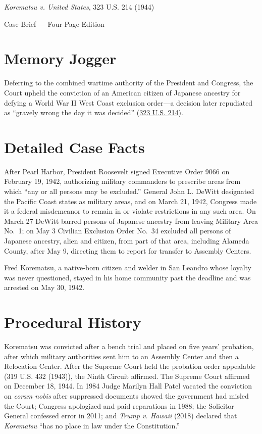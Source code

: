 \documentclass[12pt]{article}
\begin{document}
\begin{center}
{\LARGE \textit{Korematsu v. United States}, 323 U.S. 214 (1944)\par}
\vspace{0.8em}
{\large Case Brief --- Four-Page Edition\par}
\end{center}
\vspace{1em}

\section{Memory Jogger}

Deferring to the combined wartime authority of the President and Congress, the Court upheld the conviction of an American citizen of Japanese ancestry for defying a World War II West Coast exclusion order---a decision later repudiated as ``gravely wrong the day it was decided'' (\href{https://www.courtlistener.com/opinion/104040/korematsu-v-united-states/}{323 U.S. 214}).

\section{Detailed Case Facts}

After Pearl Harbor, President Roosevelt signed Executive Order 9066 on February 19, 1942, authorizing military commanders to prescribe areas from which ``any or all persons may be excluded.'' General John L. DeWitt designated the Pacific Coast states as military areas, and on March 21, 1942, Congress made it a federal misdemeanor to remain in or violate restrictions in any such area. On March 27 DeWitt barred persons of Japanese ancestry from leaving Military Area No.~1; on May 3 Civilian Exclusion Order No.~34 excluded all persons of Japanese ancestry, alien and citizen, from part of that area, including Alameda County, after May 9, directing them to report for transfer to Assembly Centers.

Fred Korematsu, a native-born citizen and welder in San Leandro whose loyalty was never questioned, stayed in his home community past the deadline and was arrested on May 30, 1942.

\section{Procedural History}

Korematsu was convicted after a bench trial and placed on five years' probation, after which military authorities sent him to an Assembly Center and then a Relocation Center. After the Supreme Court held the probation order appealable (319 U.S. 432 (1943)), the Ninth Circuit affirmed. The Supreme Court affirmed on December 18, 1944. In 1984 Judge Marilyn Hall Patel vacated the conviction on \textit{coram nobis} after suppressed documents showed the government had misled the Court; Congress apologized and paid reparations in 1988; the Solicitor General confessed error in 2011; and \textit{Trump v. Hawaii} (2018) declared that \textit{Korematsu} ``has no place in law under the Constitution.''
\end{document}

